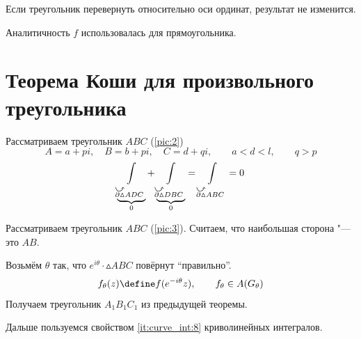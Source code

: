 Если треугольник перевернуть относительно оси ординат, результат не изменится.

\begin{remark}
	Аналитичность $ f $ использовалась для прямоугольника.
\end{remark}

\section{Теорема Коши для произвольного треугольника}

\begin{figure}[!ht]
	\centering
	\begin{subfigure}{0.4\textwidth}
		\centering
		\caption{}
		\label{pic:2}
	\end{subfigure}
	\begin{subfigure}{0.4\textwidth}
		\centering
		\caption{}
		\label{pic:3}
	\end{subfigure}
\end{figure}

\begin{theorem}
	Рассматриваем треугольник $ ABC $ (\autoref{pic:2})
	$$ A = a + pi, \quad B = b + pi, \quad C = d + qi, \qquad a < d < l, \qquad q > p $$
	$$ \underbrace{\int\limits_{\curvedir{\partial \vartriangle}ADC}}_0 + \underbrace{\int\limits_{\curvedir{\partial\vartriangle}DBC}}_0 = \int\limits_{\curvedir{\partial\vartriangle}ABC} = 0 $$
\end{theorem}

\begin{theorem}
	Рассматриваем треугольник $ ABC $ (\autoref{pic:3}). Считаем, что наибольшая сторона "--- это $ AB $.

	Возьмём $ \theta $ так, что $ e^{i\theta} \cdot \vartriangle ABC $ повёрнут ``правильно''.
	$$ f_\theta(z) \define f(e^{-i\theta}z), \qquad f_\theta \in A(G_\theta) $$
	Получаем треугольник $ A_1B_1C_1 $ из предыдущей теоремы.

	Дальше пользуемся свойством \ref{it:curve_int:8} криволинейных интегралов.
\end{theorem}

